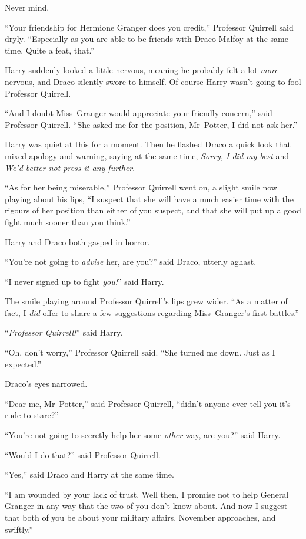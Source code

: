 Never mind.

“Your friendship for Hermione Granger does you credit,” Professor Quirrell said dryly. “Especially as you are able to be friends with Draco Malfoy at the same time. Quite a feat, that.”

Harry suddenly looked a little nervous, meaning he probably felt a lot \emph{more} nervous, and Draco silently swore to himself. Of course Harry wasn’t going to fool Professor Quirrell.

“And I doubt Miss~Granger would appreciate your friendly concern,” said Professor Quirrell. “She asked me for the position, Mr~Potter, I did not ask her.”

Harry was quiet at this for a moment. Then he flashed Draco a quick look that mixed apology and warning, saying at the same time, \emph{Sorry, I did my best} and \emph{We’d better not press it any further}.

“As for her being miserable,” Professor Quirrell went on, a slight smile now playing about his lips, “I suspect that she will have a much easier time with the rigours of her position than either of you suspect, and that she will put up a good fight much sooner than you think.”

Harry and Draco both gasped in horror.

“You’re not going to \emph{advise} her, are you?” said Draco, utterly aghast.

“I never signed up to fight \emph{you!}” said Harry.

The smile playing around Professor Quirrell’s lips grew wider. “As a matter of fact, I \emph{did} offer to share a few suggestions regarding Miss~Granger’s first battles.”

“\emph{Professor Quirrell!}” said Harry.

“Oh, don’t worry,” Professor Quirrell said. “She turned me down. Just as I expected.”

Draco’s eyes narrowed.

“Dear me, Mr~Potter,” said Professor Quirrell, “didn’t anyone ever tell you it’s rude to stare?”

“You’re not going to secretly help her some \emph{other} way, are you?” said Harry.

“Would I do that?” said Professor Quirrell.

“Yes,” said Draco and Harry at the same time.

“I am wounded by your lack of trust. Well then, I promise not to help General Granger in any way that the two of you don’t know about. And now I suggest that both of you be about your military affairs. November approaches, and swiftly.”

